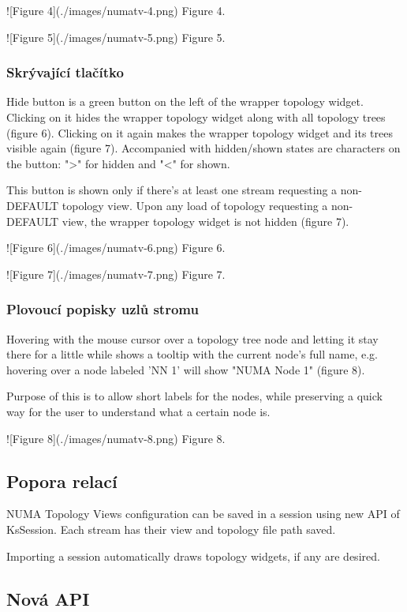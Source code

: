 \begin{code}
![Figure 4](./images/numatv-4.png)
Figure 4.

![Figure 5](./images/numatv-5.png)
Figure 5.

\subsubsection{Skrývající tlačítko}

Hide button is a green button on the left of the wrapper topology widget. Clicking on it
hides the wrapper topology widget along with all topology trees (figure 6). Clicking on
it again makes the wrapper topology widget and its trees visible again (figure 7).
Accompanied with hidden/shown states are characters on the button: ">" for hidden
and "<" for shown.

This button is shown only if there's at least one stream requesting a non-DEFAULT topology view.
Upon any load of topology requesting a non-DEFAULT view, the wrapper topology widget is not
hidden (figure 7).


![Figure 6](./images/numatv-6.png)
Figure 6.

![Figure 7](./images/numatv-7.png)
Figure 7.

\subsubsection{Plovoucí popisky uzlů stromu}

Hovering with the mouse cursor over a topology tree node and letting it stay there for a little while
shows a tooltip with the current node's full name, e.g. hovering over a node labeled 'NN 1' will show
"NUMA Node 1" (figure 8).

Purpose of this is to allow short labels for the nodes, while preserving a quick way for the user to
understand what a certain node is.

![Figure 8](./images/numatv-8.png)
Figure 8.

\subsection{Popora relací}

NUMA Topology Views configuration can be saved in a session using new API of KsSession. Each stream has their view and
topology file path saved.

Importing a session automatically draws topology widgets, if any are desired.

\subsection{Nová API}


\end{code}
